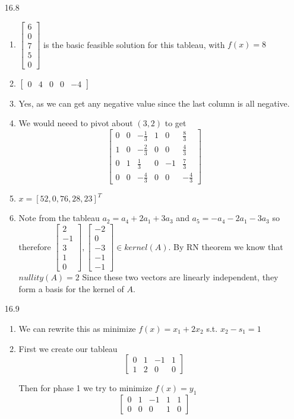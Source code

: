 \documentclass[10pt,a4paper]{article}
\newcommand\m[1]{\begin{bmatrix}#1\end{bmatrix}}
\begin{document}
\begin{enumerate}
    \item [16.8] \begin{enumerate}
        \item $\m{6 \\ 0 \\7 \\ 5\\0 }$ is the basic feasible solution for this tableau, with $f(x) = 8$
        \item $\m{ 0 & 4 & 0 &0 &-4}$
        \item Yes, as we can get any negative value since the last column is all negative.
        \item We would neeed to pivot about $(3,2)$ to get
        $$\m{0 & 0 & -\frac{1}{3} & 1 & 0 & \frac{8}{3} \\ 
             1 & 0 & -\frac{2}{3} & 0 & 0 & \frac{4}{3} \\
             0 & 1 & \frac{1}{3} & 0 & -1 & \frac{7}{3} \\
             0 & 0 & -\frac{4}{3} & 0 & 0 & -\frac{4}{3}
        }$$
        \item $x = [52, 0, 76, 28, 23]^T$
        \item Note from the tableau $a_2 = a_4 + 2a_1 + 3a_3$ and $ a_5 = -a_4 -2a_1  - 3a_3$ so therefore 
        $\m{2 \\ -1 \\ 3\\1\\0}, \m{-2 \\ 0 \\-3 \\-1\\-1} \in kernel(A)$. By RN theorem we know that $nullity(A) = 2$
        Since these two vectors are linearly independent, they form a  basis for the kernel of $A$.
    \end{enumerate}

    \item [16.9]
    \begin{enumerate}
        \item We can rewrite this as minimize $f(x) = x_1 + 2x_2$ s.t. $x_2 - s_1 = 1$
        \item First we create our tableau $$\m{ 0 & 1 & -1 & 1 \\ 1 & 2 & 0 & 0 }$$
        
        Then for phase 1 we try to minimize $f(x) = y_1$ 
        $$\m{ 0 & 1 & -1 & 1 & 1 \\ 0 & 0 & 0 & 1 & 0 }$$


\end{enumerate}
\end{enumerate}
\end{document}
